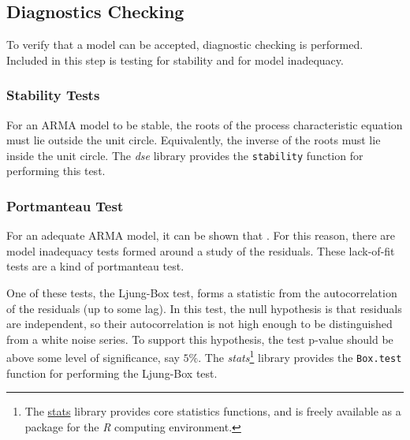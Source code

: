 \documentclass[a4paper]{scrartcl}
\begin{document}
\subsection*{Diagnostics Checking}
To verify that a model can be accepted, diagnostic checking is performed. Included in this step is testing for stability and for model inadequacy.

\subsubsection*{Stability Tests}
For an ARMA model to be stable, the roots of the process characteristic equation must lie outside the unit circle\cite[p. 56]{box_jenkins_reinsel_2008}. Equivalently, the inverse of the roots must lie inside the unit circle. The \textit{dse} library provides the \texttt{stability} function for performing this test.

\subsubsection*{Portmanteau Test}
For an adequate ARMA model, it can be shown that \cite[p. 338]{box_jenkins_reinsel_2008}. For this reason, there are model inadequacy tests formed around a study of the residuals. These lack-of-fit tests are a kind of portmanteau test.

One of these tests, the Ljung-Box test, forms a statistic from the autocorrelation of the residuals (up to some lag). In this test, the null hypothesis is that residuals are independent, so their autocorrelation is not high enough to be distinguished from a white noise series. To support this hypothesis, the test p-value should be above some level of significance, say $5\%$. The \textit{stats}\footnote{The \href{http://stat.ethz.ch/R-manual/R-patched/library/stats/html/00Index.html}{stats} library provides core statistics functions, and is freely available as a package for the \textit{R} computing environment.} library provides the \texttt{Box.test} function for performing the Ljung-Box test.
\end{document}
